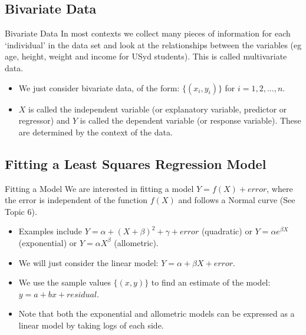 \documentclass[t,xcolor=pdftex,dvipsnames,table]{beamer}
\begin{document}
\subsection[]{Bivariate Data}
\begin{frame}[fragile]{Bivariate Data}
In most contexts we collect many pieces of information for each ‘individual’ in the data set and look at the relationships between the variables (eg age, height, weight and income for USyd students).  This is called multivariate data.

\begin{itemize}
\item
We just consider bivariate data, of the form: $\{ (x_i,y_i) \}$ for  $i=1,2, \ldots, n$.

\item
$X$ is called the independent variable (or explanatory variable, predictor or regressor) and $Y$ is called the dependent variable (or response variable). These are determined by the context of the data.
\end{itemize}
\end{frame}

\subsection[]{Fitting a Least Squares Regression Model}
\begin{frame}[fragile]{Fitting a Model}
We are interested in fitting a model $Y = f(X) + error$, where the error is independent of the function $f(X)$ and follows a Normal curve (See Topic 6).

\begin{itemize}
\item
Examples include
$Y = \alpha + (X+\beta)^2 + \gamma + error$ (quadratic) or $Y=\alpha e^{\beta X}$ (exponential) or $Y=\alpha X^{\beta}$ (allometric).

\item
We will just consider the linear model: $Y = \alpha + \beta X + error$. 

\item
We use the sample values $\{ (x,y) \}$ to find an estimate of the model:
$y = a + b x + residual$.

\item
Note that both the exponential and allometric models can be expressed as a linear model by taking logs of each side.
\end{itemize}
\end{frame}
\end{document}
